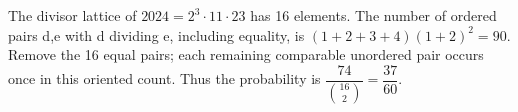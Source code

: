 The divisor lattice of $2024=2^3\cdot11\cdot23$ has 16 elements. The number of ordered pairs d,e with d dividing e, including equality, is $(1+2+3+4)(1+2)^2=90$. Remove the 16 equal pairs; each remaining comparable unordered pair occurs once in this oriented count. Thus the probability is $\dfrac{74}{\binom{16}2}=\boxed{\dfrac{37}{60}}$.
